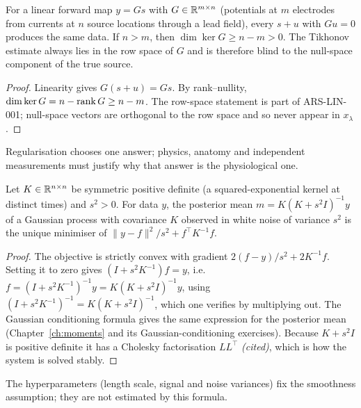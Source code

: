 \begin{theorem}\label{ars:lin-002}
For a linear forward map $y=Gs$ with $G\in\mathbb R^{m\times n}$ (potentials at $m$ electrodes from currents at $n$ source locations through a lead field), every $s+u$ with $Gu=0$ produces the same data. If $n>m$, then $\dim\ker G\ge n-m>0$. The Tikhonov estimate always lies in the row space of $G$ and is therefore blind to the null-space component of the true source.
\end{theorem}
\begin{proof}
Linearity gives $G(s+u)=Gs$. By rank--nullity, $\dim\ker G=n-\operatorname{rank} G\ge n-m$. The row-space statement is part of ARS-LIN-001; null-space vectors are orthogonal to the row space and so never appear in $x_\lambda$.
\end{proof}
Regularisation chooses one answer; physics, anatomy and independent measurements must justify why that answer is the physiological one.

\begin{theorem}\label{ars:lin-003}
Let $K\in\mathbb R^{n\times n}$ be symmetric positive definite (a squared-exponential kernel at distinct times) and $s^2>0$. For data $y$, the posterior mean $m=K(K+s^2I)^{-1}y$ of a Gaussian process with covariance $K$ observed in white noise of variance $s^2$ is the unique minimiser of $\|y-f\|^2/s^2+f^\top K^{-1}f$.
\end{theorem}
\begin{proof}
The objective is strictly convex with gradient $2(f-y)/s^2+2K^{-1}f$. Setting it to zero gives $(I+s^2K^{-1})f=y$, i.e.\ $f=(I+s^2K^{-1})^{-1}y=K(K+s^2I)^{-1}y$, using $(I+s^2K^{-1})^{-1}=K(K+s^2I)^{-1}$, which one verifies by multiplying out. The Gaussian conditioning formula gives the same expression for the posterior mean (Chapter~\ref{ch:moments} and its Gaussian-conditioning exercises). Because $K+s^2I$ is positive definite it has a Cholesky factorisation $LL^\top$ \emph{(cited)}, which is how the system is solved stably.
\end{proof}
The hyperparameters (length scale, signal and noise variances) fix the smoothness assumption; they are not estimated by this formula.

